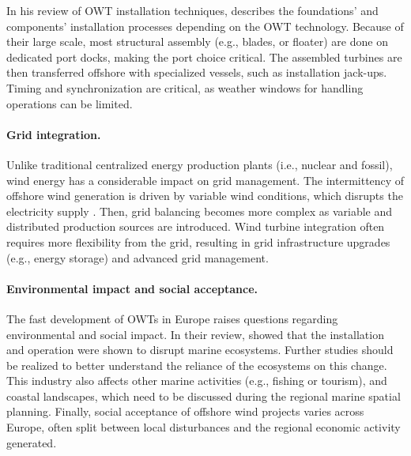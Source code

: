 In his review of OWT installation techniques, \citet{jiang_2021_owt_installation_review} describes the foundations' and components' installation processes depending on the OWT technology. 
Because of their large scale, most structural assembly (e.g., blades, or floater) are done on dedicated port docks, making the port choice critical.  
The assembled turbines are then transferred offshore with specialized vessels, such as installation jack-ups. 
Timing and synchronization are critical, as weather windows for handling operations can be limited.


\paragraph{Grid integration.}
Unlike traditional centralized energy production plants (i.e., nuclear and fossil), wind energy has a considerable impact on grid management. 
The intermittency of offshore wind generation is driven by variable wind conditions, which disrupts the electricity supply \citep{heier_2014_grid_integration}. 
Then, grid balancing becomes more complex as variable and distributed production sources are introduced.  
Wind turbine integration often requires more flexibility from the grid, resulting in grid infrastructure upgrades (e.g., energy storage) and advanced grid management. 


\paragraph{Environmental impact and social acceptance.} 
The fast development of OWTs in Europe raises questions regarding environmental and social impact. 
In their review, \citet{galparsoro_2022_owt_ecological_impact} showed that the installation and operation were shown to disrupt marine ecosystems.  
Further studies should be realized to better understand the reliance of the ecosystems on this change. 
This industry also affects other marine activities (e.g., fishing or tourism), and coastal landscapes, which need to be discussed during the regional marine spatial planning. 
Finally, social acceptance of offshore wind projects varies across Europe, often split between local disturbances and the regional economic activity generated.  


